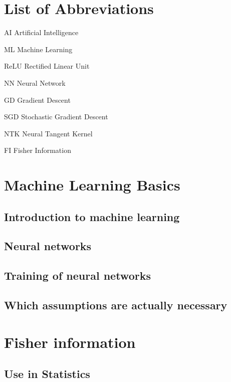 \documentclass[12pt, a4paper]{report}
\begin{document}
	\chapter*{List of Abbreviations}
	\begin{abbreviations}
		\item[AI] Artificial Intelligence
		\item[ML] Machine Learning
		\item[ReLU] Rectified Linear Unit
		\item[NN] Neural Network
		\item[GD] Gradient Descent
		\item[SGD] Stochastic Gradient Descent
		\item[NTK] Neural Tangent Kernel
		\item[FI] Fisher Information
	\end{abbreviations}	
	
	\chapter{Machine Learning Basics}
	\section{Introduction to machine learning}
	
	\section{Neural networks}
	
	\section{Training of neural networks}
	
	\section{Which assumptions are actually necessary}
	
	
	
	\chapter{Fisher information}
	\section{Use in Statistics}
	
\end{document}
